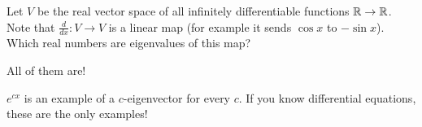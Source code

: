 \begin{problem}
	Let $V$ be the real vector space of all
	infinitely differentiable functions $\mathbb R \to \mathbb R$.
	Note that $\frac{d}{dx} \colon V \to V$ is a linear map
	(for example it sends $\cos x$ to $-\sin x$).
	Which real numbers are eigenvalues of this map?
	\begin{hint}
		All of them are!
	\end{hint}
	\begin{sol}
		$e^{cx}$ is an example of a $c$-eigenvector for every $c$.
		If you know differential equations,
		these are the only examples!
	\end{sol}
\end{problem}
